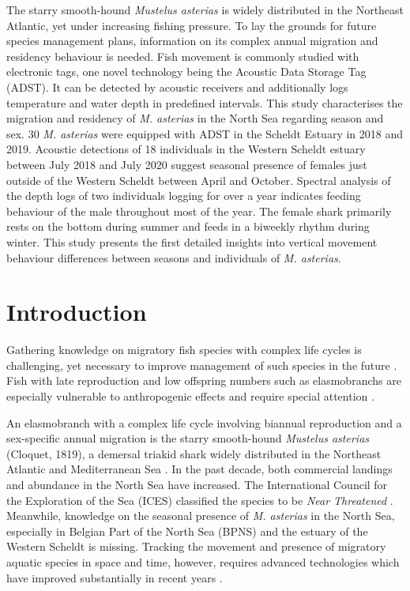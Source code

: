 \documentclass[
  authoryear,
  review,
  3p]{elsarticle}
\begin{document}
The starry smooth-hound \emph{Mustelus asterias} is widely distributed
in the Northeast Atlantic, yet under increasing fishing pressure. To lay
the grounds for future species management plans, information on its
complex annual migration and residency behaviour is needed. Fish
movement is commonly studied with electronic tags, one novel technology
being the Acoustic Data Storage Tag (ADST). It can be detected by
acoustic receivers and additionally logs temperature and water depth in
predefined intervals. This study characterises the migration and
residency of \emph{M. asterias} in the North Sea regarding season and
sex. 30 \emph{M. asterias} were equipped with ADST in the Scheldt
Estuary in 2018 and 2019. Acoustic detections of 18 individuals in the
Western Scheldt estuary between July 2018 and July 2020 suggest seasonal
presence of females just outside of the Western Scheldt between April
and October. Spectral analysis of the depth logs of two individuals
logging for over a year indicates feeding behaviour of the male
throughout most of the year. The female shark primarily rests on the
bottom during summer and feeds in a biweekly rhythm during winter. This
study presents the first detailed insights into vertical movement
behaviour differences between seasons and individuals of \emph{M.
asterias}.

\hypertarget{sec-intro}{%
\section{Introduction}\label{sec-intro}}

Gathering knowledge on migratory fish species with complex life cycles
is challenging, yet necessary to improve management of such species in
the future \citep{brownscombe_2022}. Fish with late reproduction and low
offspring numbers such as elasmobranchs are especially vulnerable to
anthropogenic effects and require special attention
\citep{stevens_2000}.

An elasmobranch with a complex life cycle involving biannual
reproduction and a sex-specific annual migration is the starry
smooth-hound \emph{Mustelus asterias} (Cloquet, 1819), a demersal
triakid shark widely distributed in the Northeast Atlantic and
Mediterranean Sea \citep{breve_2016, griffiths_2020}. In the past
decade, both commercial landings \citep{ices_2022, bitonporsmoguer_2022}
and abundance in the North Sea \citep{mccullyphillips_2015} have
increased. The International Council for the Exploration of the Sea
(ICES) classified the species to be \emph{Near Threatened}
\citep{ices_2022}. Meanwhile, knowledge on the seasonal presence of
\emph{M. asterias} in the North Sea, especially in Belgian Part of the
North Sea (BPNS) and the estuary of the Western Scheldt is missing.
Tracking the movement and presence of migratory aquatic species in space
and time, however, requires advanced technologies which have improved
substantially in recent years \citep{whoriskey_2019}.
\end{document}
